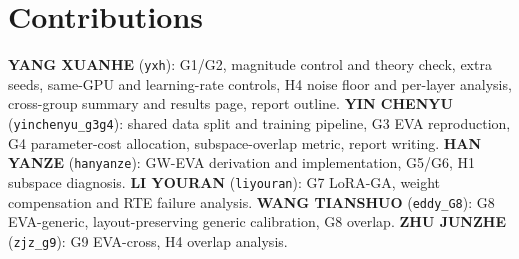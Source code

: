 \documentclass[letterpaper]{article} %
\begin{document}
\section*{Contributions}
\textbf{YANG XUANHE} (\texttt{yxh}): G1/G2, magnitude control and theory check, extra seeds, same-GPU and learning-rate controls, H4 noise floor and per-layer analysis, cross-group summary and results page, report outline.
\textbf{YIN CHENYU} (\texttt{yinchenyu\_g3g4}): shared data split and training pipeline, G3 EVA reproduction, G4 parameter-cost allocation, subspace-overlap metric, report writing.
\textbf{HAN YANZE} (\texttt{hanyanze}): GW-EVA derivation and implementation, G5/G6, H1 subspace diagnosis.
\textbf{LI YOURAN} (\texttt{liyouran}): G7 LoRA-GA, weight compensation and RTE failure analysis.
\textbf{WANG TIANSHUO} (\texttt{eddy\_G8}): G8 EVA-generic, layout-preserving generic calibration, G8 overlap.
\textbf{ZHU JUNZHE} (\texttt{zjz\_g9}): G9 EVA-cross, H4 overlap analysis.

\clearpage

\end{document}
